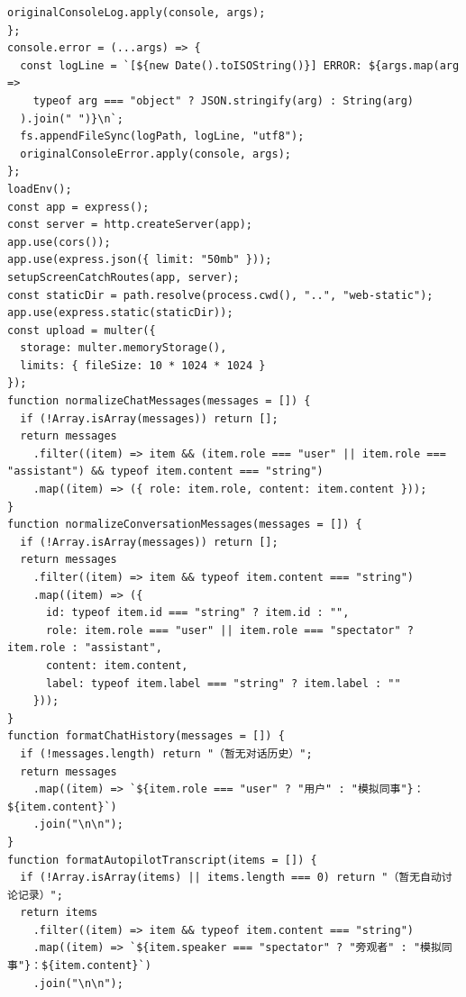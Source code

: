 \documentclass[12pt,a4paper]{article}
\begin{document}
\begin{Verbatim}[fontsize=\footnotesize]
  originalConsoleLog.apply(console, args);
};
console.error = (...args) => {
  const logLine = `[${new Date().toISOString()}] ERROR: ${args.map(arg =>
    typeof arg === "object" ? JSON.stringify(arg) : String(arg)
  ).join(" ")}\n`;
  fs.appendFileSync(logPath, logLine, "utf8");
  originalConsoleError.apply(console, args);
};
loadEnv();
const app = express();
const server = http.createServer(app);
app.use(cors());
app.use(express.json({ limit: "50mb" }));
setupScreenCatchRoutes(app, server);
const staticDir = path.resolve(process.cwd(), "..", "web-static");
app.use(express.static(staticDir));
const upload = multer({
  storage: multer.memoryStorage(),
  limits: { fileSize: 10 * 1024 * 1024 }
});
function normalizeChatMessages(messages = []) {
  if (!Array.isArray(messages)) return [];
  return messages
    .filter((item) => item && (item.role === "user" || item.role === "assistant") && typeof item.content === "string")
    .map((item) => ({ role: item.role, content: item.content }));
}
function normalizeConversationMessages(messages = []) {
  if (!Array.isArray(messages)) return [];
  return messages
    .filter((item) => item && typeof item.content === "string")
    .map((item) => ({
      id: typeof item.id === "string" ? item.id : "",
      role: item.role === "user" || item.role === "spectator" ? item.role : "assistant",
      content: item.content,
      label: typeof item.label === "string" ? item.label : ""
    }));
}
function formatChatHistory(messages = []) {
  if (!messages.length) return "（暂无对话历史）";
  return messages
    .map((item) => `${item.role === "user" ? "用户" : "模拟同事"}：${item.content}`)
    .join("\n\n");
}
function formatAutopilotTranscript(items = []) {
  if (!Array.isArray(items) || items.length === 0) return "（暂无自动讨论记录）";
  return items
    .filter((item) => item && typeof item.content === "string")
    .map((item) => `${item.speaker === "spectator" ? "旁观者" : "模拟同事"}：${item.content}`)
    .join("\n\n");
\end{Verbatim}
\newpage
{}
\fancyhead[R]{}
\end{document}
